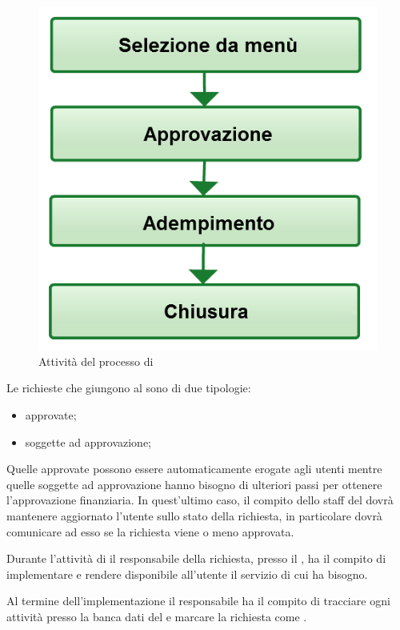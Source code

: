 \begin{figure}[htbp]
\centering
\includegraphics[scale=0.5]{Images/Diagrams/Request_fulfillment.png}
\caption{Attività del processo di }
\label{prc-request-activities-img}
\end{figure}

Le richieste che giungono al  sono di due tipologie:

\begin{itemize}
\item{approvate;}
\item{soggette ad approvazione;}
\end{itemize}

Quelle approvate possono essere automaticamente erogate agli utenti mentre quelle soggette ad approvazione hanno bisogno di ulteriori passi per ottenere l'approvazione finanziaria. In quest'ultimo caso, il compito dello staff del  dovrà mantenere aggiornato l'utente sullo stato della richiesta, in particolare dovrà comunicare ad esso se la richiesta viene o meno approvata.

Durante l'attività di  il responsabile della richiesta, presso il , ha il compito di implementare e rendere disponibile all'utente il servizio di cui ha bisogno.

Al termine dell'implementazione il responsabile ha il compito di tracciare ogni attività presso la banca dati del  e marcare la richiesta come .
